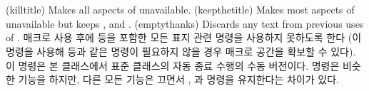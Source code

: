 \begin{syntax}
\cmd{\killtitle} \cmd{\keepthetitle} \\
\cmd{\emptythanks} \\
\end{syntax}
\glossary(killtitle)%
  {}%
  {Makes all aspects of  unavailable.}
\glossary(keepthetitle)%
  {}%
  {Makes most aspects of  unavailable but keeps ,
   and .}
\glossary(emptythanks)%
  {}%
  {Discards any text from previous uses of .}
\cmd{\killtitle} 매크로 사용 후에 \cmd{\thetitle} 등을 포함한 모든 표지 관련
명령을 사용하지 못하도록  한다 (이 명령을 사용해 \cmd{\thetitle} 등과 같은
명령이 필요하지 않을 경우 매크로 공간을 확보할 수 있다).
이 명령은 본 클래스에서 표준 클래스의 자동 종료 수행의 수동 버전이다.
\cmd{\keepthetitle} 명령은 비슷한 기능을 하지만, 다른 모든 기능은 끄면서
\cmd{\thetitle}, \cmd{\theauthor}과 \cmd{\thedate} 명령을 유지한다는 차이가
있다.

